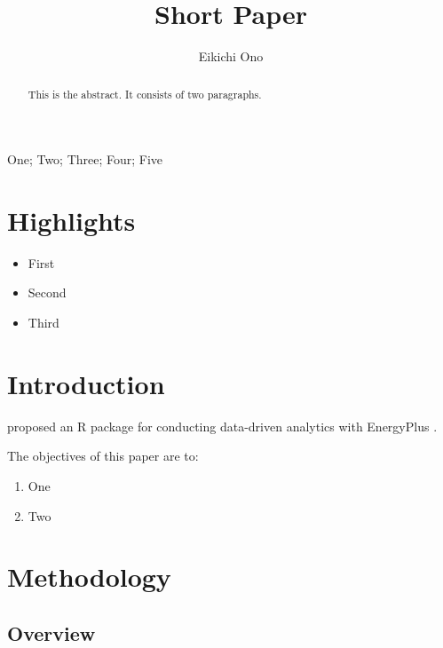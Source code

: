 \documentclass[]{elsarticle} %
\providecommand{\tightlist}{%
  \setlength{\itemsep}{0pt}\setlength{\parskip}{0pt}}
\begin{document}
\begin{frontmatter}

  \title{Short Paper}
    \author[National Universty of Singapore]{Eikichi Ono}
      \address[National Universty of Singapore]{Department, Street, City, State, Zip}
  
  \begin{abstract}
  This is the abstract.
  It consists of two paragraphs.
  \end{abstract}
   \begin{keyword} One; Two; Three; Four; Five\end{keyword}
 \end{frontmatter}

\hypertarget{highlights}{%
\section*{Highlights}\label{highlights}}

\begin{itemize}
\tightlist
\item
  First
\item
  Second
\item
  Third
\end{itemize}

\hypertarget{introduction}{%
\section{Introduction}\label{introduction}}

\citet{jia2021eplusr} proposed an R package for conducting data-driven analytics with
EnergyPlus \citep{crawley2001energyplus}.

The objectives of this paper are to:

\begin{enumerate}
\def\labelenumi{\arabic{enumi}.}
\tightlist
\item
  One
\item
  Two
\end{enumerate}

\hypertarget{methodology}{%
\section{Methodology}\label{methodology}}

\hypertarget{overview}{%
\subsection{Overview}\label{overview}}
\end{document}
